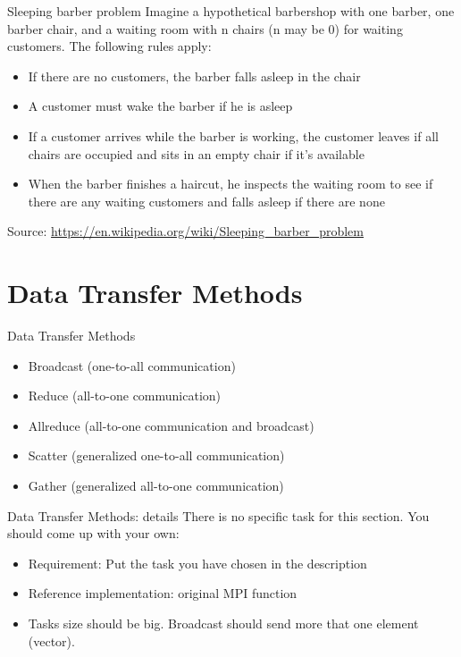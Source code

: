 \documentclass{beamer}
\begin{document}
\begin{frame}{Sleeping barber problem}
  Imagine a hypothetical barbershop with one barber, one barber chair, and a waiting room with n chairs (n may be 0) for waiting customers. The following rules apply:
  \begin{itemize}
    \item If there are no customers, the barber falls asleep in the chair
    \item A customer must wake the barber if he is asleep
    \item If a customer arrives while the barber is working, the customer leaves if all chairs are occupied and sits in an empty chair if it's available
    \item When the barber finishes a haircut, he inspects the waiting room to see if there are any waiting customers and falls asleep if there are none
  \end{itemize}

  Source: \href{https://en.wikipedia.org/wiki/Sleeping_barber_problem}{https://en.wikipedia.org/wiki/Sleeping\_barber\_problem}
\end{frame}

\section{Data Transfer Methods}

\begin{frame}{Data Transfer Methods}
  \begin{itemize}
    \item Broadcast (one-to-all communication)
    \item Reduce (all-to-one communication)
    \item Allreduce (all-to-one communication and broadcast)
    \item Scatter (generalized one-to-all communication)
    \item Gather (generalized all-to-one communication)
  \end{itemize}
\end{frame}

\begin{frame}{Data Transfer Methods: details}
  There is no specific task for this section. You should come up with your own:
  \begin{itemize}
    \item Requirement: Put the task you have chosen in the description
    \item Reference implementation: original MPI function
    \item Tasks size should be big. Broadcast should send more that one element (vector).
  \end{itemize}
\end{frame}
\end{document}
